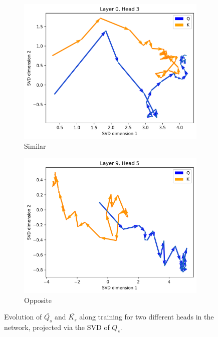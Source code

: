\begin{figure}[ht!]
    \centering
    \begin{subfigure}[b]{0.48\columnwidth}
         \includegraphics[width=\linewidth]{sources/part_1/anisotropy/imgs/l0h3_samedir_QK_Q.png}
         \caption{Similar}
         \label{fig:QK_simdir_Q}
    \end{subfigure}
    \begin{subfigure}[b]{0.48\columnwidth}
         \includegraphics[width=\linewidth]{sources/part_1/anisotropy/imgs/l9h5_diffdir_QK_Q.png}
         \caption{Opposite}
         \label{fig:QK_diffdir_Q}
    \end{subfigure}
    \caption{Evolution of $\bar{Q_s}$ and $\bar{K_s}$ along training for two different heads in the network, projected via the SVD of $Q_s$.}
    \label{fig:QK_dir_Q}
\end{figure}

